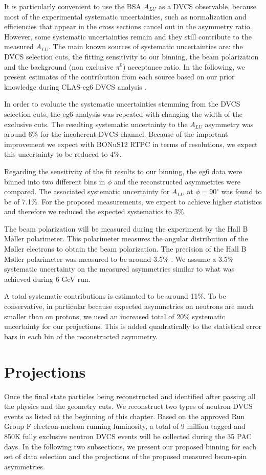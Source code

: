 It is particularly convenient to use the BSA $A_{LU}$ as a DVCS observable, 
because most of the experimental systematic uncertainties, such as 
normalization and efficiencies that appear in the cross sections cancel out in 
the asymmetry ratio. However, some systematic uncertainties remain and they 
still contribute to the measured $A_{LU}$. The main known sources of systematic 
uncertainties are: the DVCS selection cuts, the fitting sensitivity to our 
binning, the beam polarization and the background (non exclusive $\pi^0$) 
acceptance ratio. In the following, we present estimates of the contribution 
from each source based on our prior knowledge during CLAS-eg6 DVCS analysis 
\cite{eg6_note}.

In order to evaluate the systematic uncertainties stemming from the DVCS 
selection cuts, the eg6-analysis was repeated with changing the width of the 
exclusive cuts. The resulting systematic uncertainty to the $A_{LU}$ asymmetry
was around 6$\%$ for the incoherent DVCS channel. Because of the important 
improvement we expect with BONuS12 RTPC in terms of resolutions, we expect this 
uncertainty to be reduced to 4$\%$.

Regarding the sensitivity of the fit results to our binning, the eg6 data were 
binned into two different bins in $\phi$ and the reconstructed asymmetries were 
compared. The associated systematic uncertainty for $A_{LU}$ at $\phi = 90 
^{\circ}$ was found to be of 7.1$\%$. For the proposed measurements, we expect 
to achieve higher statistics and therefore we reduced the expected systematics 
to 3$\%$.
   
The beam polarization will be measured during the experiment by the Hall B 
M\o{}ller polarimeter. This polarimeter measures the angular distribution of 
the M\o{}ller electrons to obtain the beam polarization. The precision of the 
Hall B M\o{}ller polarimeter was measured to be around 3.5$\%$ 
\cite{PhysRevSTAB.7.042802}.  
We assume a 3.5$\%$ systematic uncertainty on the measured 
asymmetries similar to what was achieved during 6 GeV run.

A total systematic contributions is estimated to be around 11\%. To be 
conservative, in particular because expected asymmetries on neutrons are
much smaller than on protons, we used an increased total of 20\% 
systematic uncertainty for our projections. This is added quadratically to the statistical error 
bars in each bin of the reconstructed asymmetry.

\section{Projections}
Once the final state particles being reconstructed and identified after passing 
all the physics and the geometry cuts. We reconstruct two types of neutron DVCS 
events as listed at the beginning of this chapter. Based on the approved  Run 
Group F electron-nucleon running luminosity, a total of 9 million tagged and 
850K fully exclusive neutron DVCS events will be collected during the 35 PAC 
days. In the following two subsections, we present our proposed binning for 
each set of data selection and the projections of the proposed measured 
beam-spin asymmetries.  



